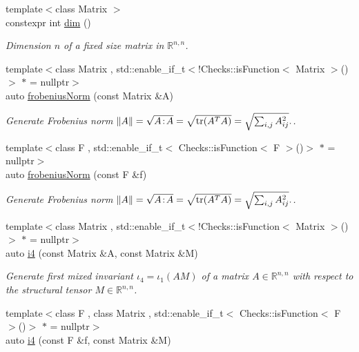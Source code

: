 \begin{DoxyCompactItemize}
{\footnotesize template$<$class Matrix $>$ }\\constexpr int \hyperlink{namespaceFunG_1_1LinearAlgebra_a13a029820c29d530274ae94968d642d4}{dim} ()
\begin{DoxyCompactList}\small\item\em Dimension $n$ of a fixed size matrix in $\mathbb{R}^{n,n}$. \end{DoxyCompactList}\item 
{\footnotesize template$<$class Matrix , std\+::enable\+\_\+if\+\_\+t$<$!\+Checks\+::is\+Function$<$ Matrix $>$()$>$ $\ast$  = nullptr$>$ }\\auto \hyperlink{group__LinearAlgebraGroup_gaa893e7d667dde98d2b119ca004745186}{frobenius\+Norm} (const Matrix \&A)
\begin{DoxyCompactList}\small\item\em Generate Frobenius norm $ \|A\| = \sqrt{A\negthinspace : \negthinspace A }= \sqrt{\mathrm{tr}(A^TA)} = \sqrt{\sum_{i,j} A_{ij}^2}. $. \end{DoxyCompactList}\item 
{\footnotesize template$<$class F , std\+::enable\+\_\+if\+\_\+t$<$ Checks\+::is\+Function$<$ F $>$()$>$ $\ast$  = nullptr$>$ }\\auto \hyperlink{group__LinearAlgebraGroup_gafa2f358f9310cecb787620ad8ec460a6}{frobenius\+Norm} (const F \&f)
\begin{DoxyCompactList}\small\item\em Generate Frobenius norm $ \|A\| = \sqrt{A\negthinspace : \negthinspace A }= \sqrt{\mathrm{tr}(A^TA)} = \sqrt{\sum_{i,j} A_{ij}^2}. $. \end{DoxyCompactList}\item 
{\footnotesize template$<$class Matrix , std\+::enable\+\_\+if\+\_\+t$<$!\+Checks\+::is\+Function$<$ Matrix $>$()$>$ $\ast$  = nullptr$>$ }\\auto \hyperlink{group__InvariantGroup_ga1898785172ecce11af0c27e54d555009}{i4} (const Matrix \&A, const Matrix \&M)
\begin{DoxyCompactList}\small\item\em Generate first mixed invariant $ \iota_4=\iota_1(AM) $ of a matrix $A\in\mathbb{R}^{n,n}$ with respect to the structural tensor $M\in\mathbb{R}^{n,n}$. \end{DoxyCompactList}\item 
{\footnotesize template$<$class F , class Matrix , std\+::enable\+\_\+if\+\_\+t$<$ Checks\+::is\+Function$<$ F $>$()$>$ $\ast$  = nullptr$>$ }\\auto \hyperlink{group__InvariantGroup_ga0df96cdb1e4b8b5a040f2adc97c51100}{i4} (const F \&f, const Matrix \&M)

\end{DoxyCompactItemize}
